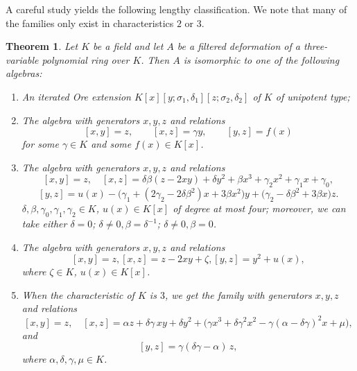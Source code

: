 \documentclass[a4paper,11pt,twoside,notitlepage,reqno]{amsart}
\theoremstyle{plain}
\newtheorem{thm}{Theorem}
\numberwithin{thm}{section}
\theoremstyle{definition}
\begin{document}
A careful study yields the following lengthy classification.  We note that many of the families only exist in characteristics $2$ or $3$.
\begin{thm}\label{thm:main}
Let $K$ be a field and let $A$ be a filtered deformation of a three-variable polynomial ring over $K$.  Then $A$ is isomorphic to one of the following algebras:
\begin{enumerate}
\item An iterated Ore extension $K[x][y;\sigma_1,\delta_1][z;\sigma_2,\delta_2]$ of $K$ of unipotent type;
\item The algebra with generators $x,y,z$ and relations $$[x,y]=z, \qquad [x,z]=\gamma y, \qquad [y,z]=f(x)$$ for some $\gamma\in K$ and some $f(x)\in K[x]$.




\item The algebra with generators $x,y,z$ and relations
$$[x,y]=z, \quad [x,z]=\delta\beta(z-2xy)+\delta y^2+\beta x^3+\gamma_2 x^2+\gamma_1 x+\gamma_0,$$ 
$$[y,z]=u(x)-\Big(\gamma_1+(2\gamma_2-2\delta\beta^2)x+3\beta x^2\Big)y+\Big(\gamma_2-\delta\beta^2+3\beta x\Big)z.$$
 $\delta, \beta,\gamma_0,\gamma_1,\gamma_2\in K$, $u(x)\in K[x]$ of degree at most four; moreover, we can take either $\delta=0$; $\delta\neq 0, \beta=\delta^{-1}$; $\delta\neq 0, \beta=0$.
 
\item The algebra with generators $x,y,z$ and relations
$$[x,y]=z, [x,z]= z -2 xy +\zeta, [y,z]= y^2 +u(x),$$
where $\zeta\in K$, $u(x)\in K[x]$.

\item When the characteristic of $K$ is $3$, we get the family with generators
$x,y,z$ and relations
$$[x,y]=z,\quad [x,z]= \alpha z +\delta\gamma\, xy + \delta y^2 + \big(\gamma x^3 +\delta \gamma^2 x^2-\gamma (\alpha-\delta \gamma)^2 x+\mu\big),$$
and
$$[y,z]= \gamma(\delta\gamma -\alpha)\,z,$$
where $\alpha,\delta,\gamma,\mu\in K$.



\end{enumerate}
\end{thm}
\end{document}
